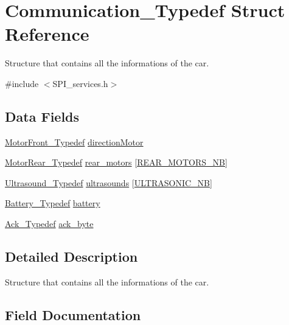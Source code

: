 \hypertarget{struct_communication___typedef}{}\section{Communication\+\_\+\+Typedef Struct Reference}
\label{struct_communication___typedef}


Structure that contains all the informations of the car.  




{\ttfamily \#include $<$S\+P\+I\+\_\+services.\+h$>$}

\subsection*{Data Fields}
\begin{DoxyCompactItemize}
\item 
\hyperlink{struct_motor_front___typedef}{Motor\+Front\+\_\+\+Typedef} \hyperlink{struct_communication___typedef_a3a8290e3b46dab6047435b592b81efdc}{direction\+Motor}
\item 
\hyperlink{struct_motor_rear___typedef}{Motor\+Rear\+\_\+\+Typedef} \hyperlink{struct_communication___typedef_a718b0adfdc43ccf0d67399e1583ac599}{rear\+\_\+motors} \mbox{[}\hyperlink{motor__common_8h_adca07b02a9d917897a9809b7b19a2f79}{R\+E\+A\+R\+\_\+\+M\+O\+T\+O\+R\+S\+\_\+\+NB}\mbox{]}
\item 
\hyperlink{struct_ultrasound___typedef}{Ultrasound\+\_\+\+Typedef} \hyperlink{struct_communication___typedef_a30835d9cdfc16faa82377c90fe401538}{ultrasounds} \mbox{[}\hyperlink{sensors__common_8h_a26f5abbcd6c4905330b730b809794176}{U\+L\+T\+R\+A\+S\+O\+N\+I\+C\+\_\+\+NB}\mbox{]}
\item 
\hyperlink{struct_battery___typedef}{Battery\+\_\+\+Typedef} \hyperlink{struct_communication___typedef_ae3d4b0bc189b56df3a0e34afd8fe98b2}{battery}
\item 
\hyperlink{struct_ack___typedef}{Ack\+\_\+\+Typedef} \hyperlink{struct_communication___typedef_ab5a71971f578ef634621b2323ecbc0d1}{ack\+\_\+byte}
\end{DoxyCompactItemize}


\subsection{Detailed Description}
Structure that contains all the informations of the car. 

\subsection{Field Documentation}
\mbox{\label{struct_communication___typedef_ab5a71971f578ef634621b2323ecbc0d1}} 
